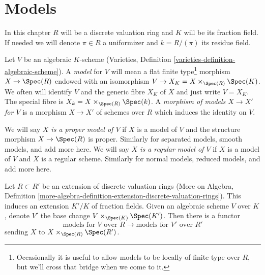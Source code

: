 \section{Models}
\label{section-models}

\noindent
In this chapter $R$ will be a discrete valuation ring and $K$ will
be its fraction field. If needed we will denote $\pi \in R$ a
uniformizer and $k = R/(\pi)$ its residue field.

\medskip\noindent
Let $V$ be an algebraic $K$-scheme
(Varieties, Definition \ref{varieties-definition-algebraic-scheme}).
A {\it model} for $V$ will
mean a flat finite type\footnote{Occasionally it is useful to
allow models to be locally of finite type over $R$, but we'll
cross that bridge when we come to it.}
morphism $X \to \Spec(R)$ endowed with
an isomorphism $V \to X_K = X \times_{\Spec(R)} \Spec(K)$. We often
will identify $V$ and the generic fibre $X_K$ of $X$ and
just write $V = X_K$.
The special fibre is $X_k = X \times_{\Spec(R)} \Spec(k)$.
A {\it morphism of models $X \to X'$ for $V$}
is a morphism $X \to X'$ of schemes over $R$ which induces
the identity on $V$.

\medskip\noindent
We will say {\it $X$ is a proper model of $V$} if $X$ is a model
of $V$ and the structure morphism $X \to \Spec(R)$ is proper.
Similarly for separated models, smooth models, and add more here.
We will say {\it $X$ is a regular model of $V$} if $X$ is a model
of $V$ and $X$ is a regular scheme.
Similarly for normal models, reduced models, and add more here.

\medskip\noindent
Let $R \subset R'$ be an extension of discrete valuation rings
(More on Algebra, Definition
\ref{more-algebra-definition-extension-discrete-valuation-rings}).
This induces an extension $K'/K$ of fraction fields.
Given an algebraic scheme $V$ over $K$, denote $V'$ the
base change $V \times_{\Spec(K)} \Spec(K')$. Then there is
a functor
$$
\text{models for }V\text{ over }R
\longrightarrow
\text{models for }V'\text{ over }R'
$$
sending $X$ to $X \times_{\Spec(R)} \Spec(R')$.

